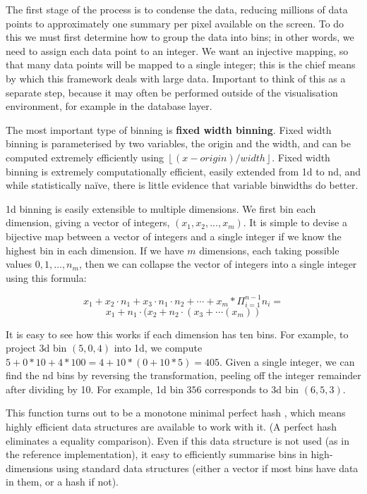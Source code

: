 \documentclass[journal]{vgtc}                %
\begin{document}
The first stage of the process is to condense the data, reducing millions of data points to approximately one summary per pixel available on the screen.  To do this we must first determine how to group the data into bins; in other words, we need to assign each data point to an integer. We want an injective mapping, so that many data points will be mapped to a single integer; this is the chief means by which this framework deals with large data. Important to think of this as a separate step, because it may often be performed outside of the visualisation environment, for example in the database layer. 

The most important type of binning is {\bf fixed width binning}. Fixed width binning is parameterised by two variables, the origin and the width, and can be computed extremely efficiently using $\left \lfloor (x - origin) / width \right \rfloor $. Fixed width binning is extremely computationally efficient, easily extended from 1d to nd, and while statistically na\"ive, there is little evidence that variable binwidths do better.

1d binning is easily extensible to multiple dimensions. We first bin each dimension, giving a vector of integers, $(x_1, x_2, ..., x_m)$. It is simple to devise a bijective map between a vector of integers and a single integer if we know the highest bin in each dimension. If we have $m$ dimensions, each taking possible values $0, 1, \ldots, n_m$, then we can collapse the vector of integers into a single integer using this formula:

\[ x_1 + x_2 \cdot n_1 + x_3 \cdot n_1 \cdot n_2 + \cdots + x_m * \Pi^{n-1}_{i = 1} n_i = \]
\[ x_1 + n_1 \cdot (x_2 + n_2 \cdot (x_3 + \cdots(x_m)) \]

It is easy to see how this works if each dimension has ten bins. For example, to project 3d bin $(5, 0, 4)$ into 1d, we compute $5 + 0 * 10 + 4 * 100 = 4 + 10 * (0 + 10 * 5) = 405$. Given a single integer, we can find the nd bins by reversing the transformation, peeling off the integer remainder after dividing by 10. For example, 1d bin $356$ corresponds to 3d bin $(6, 5, 3)$.

This function turns out to be a monotone minimal perfect hash \citep{belazzougui:2009}, which means highly efficient data structures are available to work with it. (A perfect hash eliminates a equality comparison). Even if this data structure is not used (as in the reference implementation), it easy to efficiently summarise bins in high-dimensions using standard data structures (either a vector if most bins have data in them, or a hash if not).
\end{document}
